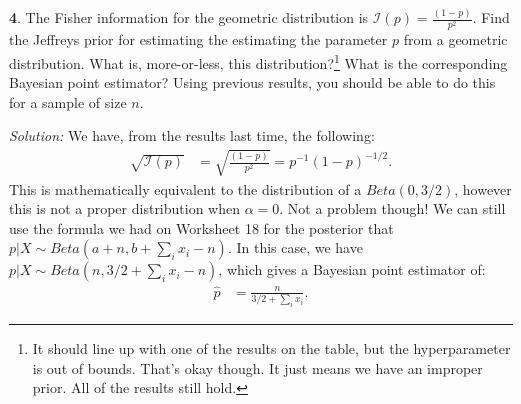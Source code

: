 \documentclass{tufte-handout}
\begin{document}
\textbf{4}. The Fisher information for the geometric distribution is $\mathcal{I}(p) = \frac{(1-p)}{p^2}$.
Find the Jeffreys prior for estimating the estimating the parameter $p$ from
a geometric distribution. What is, more-or-less, this distribution?\footnote{
  It should line up with one of the results on the table, but the hyperparameter
  is out of bounds. That's okay though. It just means we have an improper prior.
  All of the results still hold. 
} What is the corresponding Bayesian point estimator? Using previous results,
you should be able to do this for a sample of size $n$.

\textit{Solution:} We have, from the results last time, the following:
\begin{align*}
\sqrt{\mathcal{I}(p)} &= \sqrt{\frac{(1-p)}{p^2}} = p^{-1} (1 - p)^{-1/2}.
\end{align*}
This is mathematically equivalent to the distribution of a $Beta(0, 3/2)$,
however this is not a proper distribution when $\alpha = 0$. Not a problem
though! We can still use the formula we had on Worksheet 18 for the posterior
that  $p | X \sim Beta(a + n, b + \sum_i x_i - n)$. In this case, we have
$p | X \sim Beta(n, 3/2 + \sum_i x_i - n)$, which gives a Bayesian point
estimator of:
\begin{align*}
\widehat{p} &= \frac{n}{3/2 + \sum_i x_i}.
\end{align*}
\end{document}
